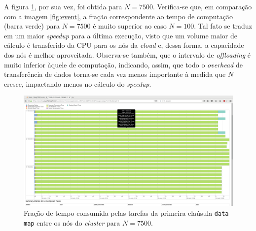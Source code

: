 \documentclass[12pt, a4paper]{article}
\begin{document}
A figura \ref{fig:event5000}, por sua vez, foi obtida para \(N = 7500\).
Verifica-se que, em comparação com a imagem \ref{fig:event}, a fração
correspondente ao tempo de computação (barra verde) para \( N = 7500\) é muito
superior ao caso \(N = 100\). Tal fato se traduz em um maior \textit{speedup}
para a última execução, visto que um volume maior de cálculo é transferido da
CPU para os nós da \textit{cloud} e, dessa forma, a capacidade dos nós é melhor
aproveitada. Observa-se também, que o intervalo de \textit{offloading} é muito
inferior àquele de computação, indicando, assim, que todo o \textit{overhead} de
transferência de dados torna-se cada vez menos importante à medida que \(N\)
cresce, impactando menos no cálculo do \textit{speedup}.

\begin{figure}[h!] 
    \centering
    \includegraphics[width=\textwidth]{img/7500/event}
    \caption{Fração de tempo consumida pelas tarefas da primeira claúsula
    \texttt{data map} entre os nós do \textit{cluster} para \(N = 7500\).}        
    \label{fig:event5000}
\end{figure}
\end{document}

